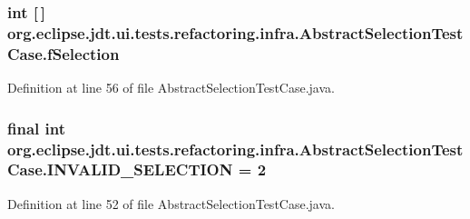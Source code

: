 \hypertarget{classorg_1_1eclipse_1_1jdt_1_1ui_1_1tests_1_1refactoring_1_1infra_1_1AbstractSelectionTestCase_ad2eec97bb16037d6c237076148847e7e}{
\subsubsection[{fSelection}]{\setlength{\rightskip}{0pt plus 5cm}int \mbox{[}$\,$\mbox{]} {\bf org.eclipse.jdt.ui.tests.refactoring.infra.AbstractSelectionTestCase.fSelection}}}
\label{classorg_1_1eclipse_1_1jdt_1_1ui_1_1tests_1_1refactoring_1_1infra_1_1AbstractSelectionTestCase_ad2eec97bb16037d6c237076148847e7e}


Definition at line 56 of file AbstractSelectionTestCase.java.

\hypertarget{classorg_1_1eclipse_1_1jdt_1_1ui_1_1tests_1_1refactoring_1_1infra_1_1AbstractSelectionTestCase_a87e51300c32b4669f9f9dfa1311794ee}{
\subsubsection[{INVALID\_\-SELECTION}]{\setlength{\rightskip}{0pt plus 5cm}final int {\bf org.eclipse.jdt.ui.tests.refactoring.infra.AbstractSelectionTestCase.INVALID\_\-SELECTION} = 2}}
\label{classorg_1_1eclipse_1_1jdt_1_1ui_1_1tests_1_1refactoring_1_1infra_1_1AbstractSelectionTestCase_a87e51300c32b4669f9f9dfa1311794ee}


Definition at line 52 of file AbstractSelectionTestCase.java.

